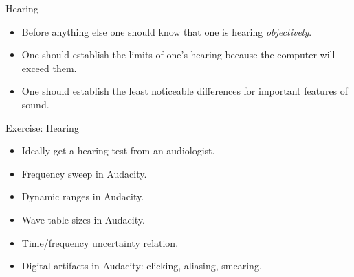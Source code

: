 \documentclass{beamer}
\begin{document}
    \begin{frame}{Hearing}
    	\begin{itemize}
	  \item Before anything else one should know that one is hearing \textit{objectively}.
	  \item One should establish the limits of one's hearing because the computer 
	  will exceed them.
	  \item One should establish the least noticeable differences for important features of sound. 
	\end{itemize}
    \end{frame}
    \begin{frame}{Exercise: Hearing}
    	\begin{itemize}
	  \item Ideally get a hearing test from an audiologist.
	  \item Frequency sweep in Audacity.
	  \item Dynamic ranges in Audacity.
	  \item Wave table sizes in Audacity.
	  \item Time/frequency uncertainty relation.
	  \item Digital artifacts in Audacity: clicking, aliasing, smearing.
	\end{itemize}
    \end{frame}
    
\end{document}
